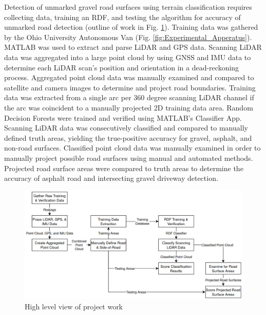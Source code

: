 \documentclass[journal,onecolumn]{IEEEtran}
\begin{document}
%		
	
		{Detection of unmarked gravel road surfaces using terrain classification requires collecting data, training an RDF, and testing the algorithm for accuracy of unmarked road detection (outline of work in Fig. \ref{fig:flowz_7}). Training data was gathered by the Ohio University Autonomous Van (Fig. \ref{fig:Experimental_Apperatus}). MATLAB was used to extract and parse LiDAR and GPS data. Scanning LiDAR data was aggregated into a large point cloud by using GNSS and IMU data to determine each LiDAR scan's position and orientation in a dead-reckoning process. Aggregated point cloud data was manually examined and compared to satellite and camera images to determine and project road boundaries. Training data was extracted from a single arc per 360 degree scanning LiDAR channel if the arc was coincident to a manually projected 2D training data area. Random Decision Forests were trained and verified using MATLAB's Classifier App. Scanning LiDAR data was consecutively classified and compared to manually defined truth areas, yielding the true-positive accuracy for gravel, asphalt, and non-road surfaces. Classified point cloud data was manually examined in order to manually project possible road surfaces using manual and automated methods. Projected road surface areas were compared to truth areas to determine the accuracy of asphalt road and intersecting gravel driveway detection.}
			
			\begin{figure}[H]
				\centering
				\includegraphics[width=0.9\linewidth]{figures/flowz_7}
				\caption[Project Flow]{High level view of project work}
				\label{fig:flowz_7}
			\end{figure}	
	
\end{document}
